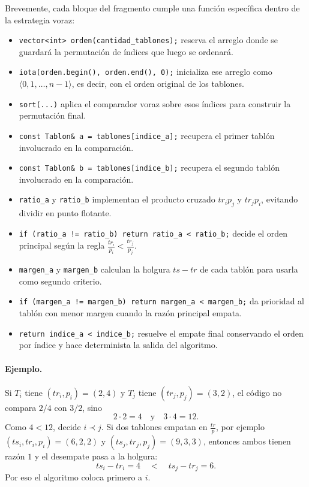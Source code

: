 \documentclass[12pt,a4paper]{article}
\begin{document}
\noindent Brevemente, cada bloque del fragmento cumple una funci\'on espec\'ifica dentro de la estrategia voraz:
\begin{itemize}
  \item \texttt{vector<int> orden(cantidad\_tablones);} reserva el arreglo donde se guardar\'a la permutaci\'on de \'indices que luego se ordenar\'a.
  \item \texttt{iota(orden.begin(), orden.end(), 0);} inicializa ese arreglo como \(\langle 0,1,\dots,n-1\rangle\), es decir, con el orden original de los tablones.
  \item \texttt{sort(...)} aplica el comparador voraz sobre esos \'indices para construir la permutaci\'on final.
  \item \texttt{const Tablon\& a = tablones[indice\_a];} recupera el primer tabl\'on involucrado en la comparaci\'on.
  \item \texttt{const Tablon\& b = tablones[indice\_b];} recupera el segundo tabl\'on involucrado en la comparaci\'on.
  \item \texttt{ratio\_a} y \texttt{ratio\_b} implementan el producto cruzado \(tr_i p_j\) y \(tr_j p_i\), evitando dividir en punto flotante.
  \item \texttt{if (ratio\_a != ratio\_b) return ratio\_a < ratio\_b;} decide el orden principal seg\'un la regla \(\frac{tr_i}{p_i}<\frac{tr_j}{p_j}\).
  \item \texttt{margen\_a} y \texttt{margen\_b} calculan la holgura \(ts-tr\) de cada tabl\'on para usarla como segundo criterio.
  \item \texttt{if (margen\_a != margen\_b) return margen\_a < margen\_b;} da prioridad al tabl\'on con menor margen cuando la raz\'on principal empata.
  \item \texttt{return indice\_a < indice\_b;} resuelve el empate final conservando el orden por \'indice y hace determinista la salida del algoritmo.
\end{itemize}

\paragraph{Ejemplo.}
Si \(T_i\) tiene \((tr_i,p_i)=(2,4)\) y \(T_j\) tiene \((tr_j,p_j)=(3,2)\), el c\'odigo no compara \(2/4\) con \(3/2\), sino
\[
2\cdot 2 = 4
\quad\text{y}\quad
3\cdot 4 = 12.
\]
Como \(4<12\), decide \(i \prec j\). Si dos tablones empatan en \(\frac{tr}{p}\), por ejemplo \((ts_i,tr_i,p_i)=(6,2,2)\) y \((ts_j,tr_j,p_j)=(9,3,3)\), entonces ambos tienen raz\'on \(1\) y el desempate pasa a la holgura:
\[
ts_i-tr_i = 4
\quad<\quad
ts_j-tr_j = 6.
\]
Por eso el algoritmo coloca primero a \(i\).
\end{document}
